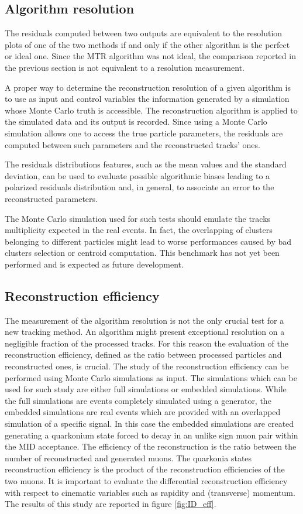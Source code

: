 \subsection{Algorithm resolution}
The residuals computed between two outputs are equivalent to the resolution plots of one of the two methods if and only if the other algorithm is the perfect or ideal one.
Since the MTR algorithm was not ideal, the comparison reported in the previous section is not equivalent to a resolution measurement.

A proper way to determine the reconstruction resolution of a given algorithm is to use as input and control variables the information generated by a simulation whose Monte Carlo truth is accessible.
The reconstruction algorithm is applied to the simulated data and its output is recorded.
Since using a Monte Carlo simulation allows one to access the true particle parameters, the residuals are computed between such parameters and the reconstructed tracks' ones.

The residuals distributions features, such as the mean values and the standard deviation, can be used to evaluate possible algorithmic biases leading to a polarized residuals distribution and, in general, to associate an error to the reconstructed parameters.

The Monte Carlo simulation used for such tests should emulate the tracks multiplicity expected in the real events.
In fact, the overlapping of clusters belonging to different particles might lead to worse performances caused by bad clusters selection or centroid computation.
This benchmark has not yet been performed and is expected as future development.

\subsection{Reconstruction efficiency}
The measurement of the algorithm resolution is not the only crucial test for a new tracking method.
An algorithm might present exceptional resolution on a negligible fraction of the processed tracks.
For this reason the evaluation of the reconstruction efficiency, defined as the ratio between processed particles and reconstructed ones, is crucial.
The study of the reconstruction efficiency can be performed using Monte Carlo simulations as input.
The simulations which can be used for such study are either full simulations or embedded simulations.
While the full simulations are events completely simulated using a generator, the embedded simulations are real events which are provided with an overlapped simulation of a specific signal.
In this case the embedded simulations are created generating a quarkonium state forced to decay in an unlike sign muon pair within the MID acceptance.
The efficiency of the reconstruction is the ratio between the number of reconstructed and generated muons.
The quarkonia states reconstruction efficiency is the product of the reconstruction efficiencies of the two muons.
It is important to evaluate the differential reconstruction efficiency with respect to cinematic variables such as rapidity and (transverse) momentum.
The results of this study are reported in figure \ref{fig:ID_eff}.

